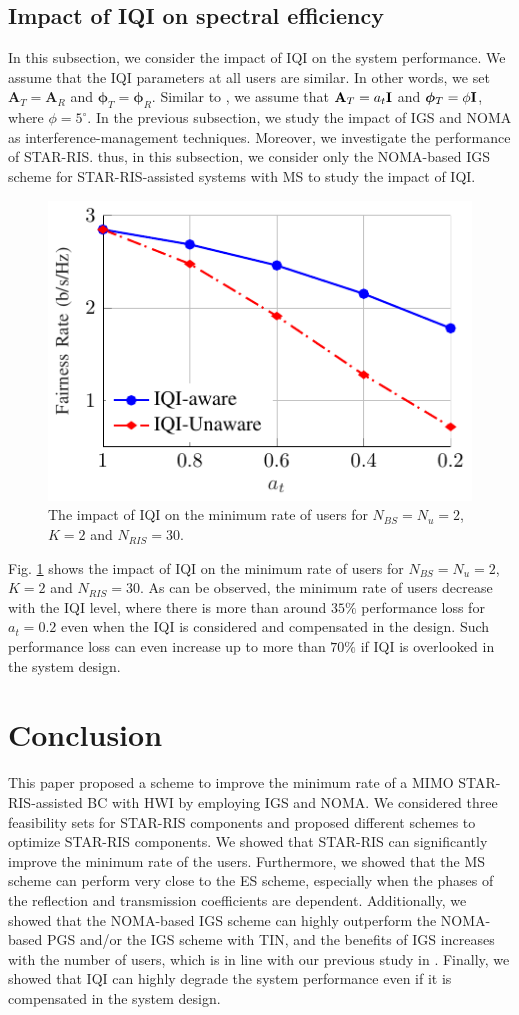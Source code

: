 \documentclass[a4, conference]{IEEEtran}
\theoremstyle{definition}
\begin{document}
\subsection{Impact of IQI on spectral efficiency}
In this subsection, we consider the impact of IQI on the system performance. We assume that the  IQI parameters at all users are similar. In other words, we set $\mathbf{A}_T=\mathbf{A}_R$ and $\bm{\phi}_T=\bm{\phi}_R$. Similar to \cite{javed2019multiple}, we assume that  $\mathbf{A}_T=a_t{\bf I}$ and $\bm{\phi}_T=\phi{\bf I}$, where $\phi=5^{\circ}$. In the previous subsection, we study the impact of IGS and NOMA as interference-management techniques. Moreover, we investigate the performance of STAR-RIS. thus, in this subsection, we consider only the NOMA-based IGS scheme for STAR-RIS-assisted systems with MS to study the impact of IQI. 

\begin{figure}[t!]
    \centering
       \includegraphics[width=.45\textwidth]{iqi}
    \caption{The impact of IQI on the minimum rate of users for $N_{BS}=N_u=2$, $K=2$ and $N_{RIS}=30$.}	\label{Fig-iqi} 
\end{figure}
Fig. \ref{Fig-iqi} shows the impact of IQI on the minimum rate of users for $N_{BS}=N_u=2$, $K=2$ and $N_{RIS}=30$. As can be observed, the minimum rate of users decrease with the IQI level, where there is more than around $35\%$ performance loss for $a_t=0.2$ even when the IQI is considered and compensated in the design.
Such performance loss can even increase up to more than $70\%$ if IQI is overlooked in the system design. 


\section{Conclusion}
This paper proposed a scheme to improve the minimum rate of a MIMO STAR-RIS-assisted BC with HWI by employing IGS and NOMA. We considered three feasibility sets for STAR-RIS components and proposed different schemes to optimize STAR-RIS components. We showed that STAR-RIS can significantly improve the minimum rate of the users. Furthermore, we showed that the MS scheme can perform very close to the ES scheme, especially when the phases of the reflection and transmission coefficients are dependent. Additionally, we showed that the NOMA-based IGS scheme can highly outperform the NOMA-based PGS and/or the IGS scheme with TIN, and the benefits of IGS increases with the number of users, which is in line with our previous study in \cite{soleymani2022noma}. Finally, we showed that IQI can highly degrade the system performance even if it is compensated in the system design. 
\end{document}
